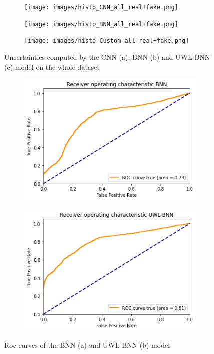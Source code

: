 \documentclass[11pt,twoside,a4paper]{article}
\begin{document}
\begin{figure}[!t]
    \centering
    \begin{subfigure}{0.30\textwidth}
	\texttt{[image: images/histo\_CNN\_all\_real+fake.png]}
        \caption{}
    \end{subfigure}
    \begin{subfigure}{0.30\textwidth}
	\texttt{[image: images/histo\_BNN\_all\_real+fake.png]}
        \caption{}
    \end{subfigure}
	\begin{subfigure}{0.30\textwidth}
	\texttt{[image: images/histo\_Custom\_all\_real+fake.png]}
        \caption{}
    \end{subfigure}
    \caption{Uncertainties computed by the CNN (a), BNN (b) and UWL-BNN (c) model on the whole dataset}
    \label{fig:histograms}
\end{figure}

\begin{figure}[!b]
    \centering
    \begin{subfigure}{0.49\textwidth}
	\includegraphics[width=\linewidth]{images/ROC_BNN.png}
        \caption{}
    \end{subfigure}
    \begin{subfigure}{0.49\textwidth}
	\includegraphics[width=\linewidth]{images/ROC_Custom.png}
        \caption{}
    \end{subfigure}
    \caption{Roc curves of the BNN (a) and UWL-BNN (b) model}
    \label{fig:roc}
\end{figure}
\end{document}
